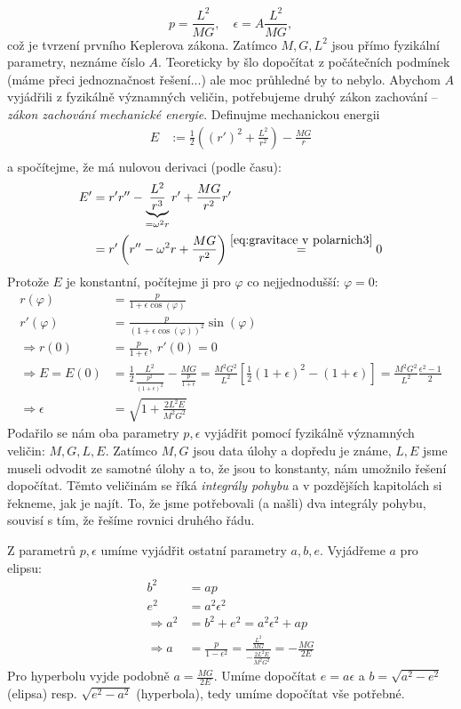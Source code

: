 \begin{equation*}
  p=\frac{L^{2}}{MG},\quad \epsilon=A \frac{L^{2}}{MG},
\end{equation*}
což je tvrzení prvního Keplerova zákona. Zatímco $M,G,L^{2}$ jsou přímo fyzikální parametry, neznáme číslo $A.$ Teoreticky by šlo dopočítat z počátečních podmínek (máme přeci jednoznačnost řešení...) ale moc průhledné by to nebylo. Abychom $A$ vyjádřili z fyzikálně významných veličin, potřebujeme druhý zákon zachování -- \emph{zákon zachování mechanické energie}. Definujme mechanickou energii
\begin{align*}
	E&:= \frac{1}{2}\left( (r')^{2}+\frac{L^{2}}{r^{2}}\right)-\frac{MG}{r} \\
\end{align*}
a spočítejme, že má nulovou derivaci (podle času):
\begin{align*}
	E' &= r'r''-\underbrace{\frac{L^{2}}{r^{3}}}_{=\omega^{2}r}r'+\frac{MG}{r^{2}}r' \\
		     &= r'\left(r''-\omega^{2}r+\frac{MG}{r^{2}}\right)\stackrel{\ref{eq:gravitace v polarnich3}}{=}0
\end{align*}
Protože $E$ je konstantní, počítejme ji pro $\varphi$ co nejjednodušší: $\varphi=0:$
\begin{align*}
	r(\varphi) &= \frac{p}{1+\epsilon\cos(\varphi)} \\
	r'(\varphi) &= \frac{p}{(1+\epsilon\cos(\varphi))^{2}}\sin(\varphi) \\
	\Rightarrow r(0)&= \frac{p}{1+\epsilon},\ r'(0)=0 \\
	\Rightarrow E = E(0)&=\frac{1}{2}\frac{L^{2}}{\frac{p^{2}}{(1+\epsilon)^{2}}}-\frac{MG}{\frac{p}{1+\epsilon}}=\frac{M^{2}G^{2}}{L^{2}}\left[\frac{1}{2}(1+\epsilon)^{2}-(1+\epsilon)\right] =\frac{M^{2}G^{2}}{L^{2}}\frac{\epsilon^{2}-1}{2} \\
	\Rightarrow \epsilon&=\sqrt{1+\frac{2L^2E}{M^{2}G^{2}}}
\end{align*}
Podařilo se nám oba parametry $p,\epsilon$ vyjádřit pomocí fyzikálně významných veličin: $M,G, L, E.$ Zatímco $M,G$ jsou data úlohy a dopředu je známe, $L,E$ jsme museli odvodit ze samotné úlohy a to, že jsou to konstanty, nám umožnilo řešení dopočítat. Těmto veličinám se říká \emph{integrály pohybu} a v pozdějších kapitolách si řekneme, jak je najít. To, že jsme potřebovali (a našli) dva integrály pohybu, souvisí s tím, že řešíme rovnici druhého řádu.

Z parametrů $p,\epsilon$ umíme vyjádřit ostatní parametry $a,b,e.$ Vyjádřeme $a$ pro elipsu:
\begin{align*}
	b^{2} &= ap \\
	e^{2} &= a^{2}\epsilon^{2} \\
	\Rightarrow a^{2}&=b^{2}+e^{2}=a^{2}\epsilon^{2}+ap\\
	\Rightarrow  a&=\frac{p}{1-\epsilon^{2}}=\frac{\frac{L^{2}}{MG}}{-\frac{2L^{2}E}{M^{2}G^{2}}}=-\frac{MG}{2E}
\end{align*}
Pro hyperbolu vyjde podobně $a=\frac{MG}{2E}.$ Umíme dopočítat $e=a\epsilon$ a $b=\sqrt{a^{2}-e^{2}}$ (elipsa) resp. $\sqrt{e^{2}-a^{2}}$ (hyperbola), tedy umíme dopočítat vše potřebné.

